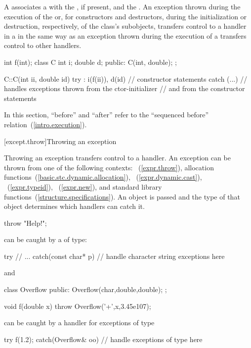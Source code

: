 \pnum
{}%
%
A
associates a
with the
,
if present, and the
.
An exception
thrown during the execution of the
or, for constructors and destructors, during the initialization or
destruction, respectively, of the class's subobjects,
transfers control to a handler in a
in the same way as an exception thrown during the execution of a
transfers control to other handlers.
\enterexample
\begin{codeblock}
int f(int);
class C {
  int i;
  double d;
public:
  C(int, double);
};

C::C(int ii, double id)
try : i(f(ii)), d(id) {
    // constructor statements
}
catch (...) {
    // handles exceptions thrown from the ctor-initializer
    // and from the constructor statements
}

\end{codeblock}
\exitexample

\pnum
In this section, ``before'' and ``after'' refer to the
``sequenced before'' relation~(\ref{intro.execution}).

[except.throw]{Throwing an exception}%
%

\pnum
Throwing an exception transfers control to a handler.
\enternote
An exception can be thrown from one of the following contexts:
~(\ref{expr.throw}),
allocation functions~(\ref{basic.stc.dynamic.allocation}),
~(\ref{expr.dynamic.cast}),
~(\ref{expr.typeid}),
~(\ref{expr.new}), and standard library
functions~(\ref{structure.specifications}).
\exitnote
An object is passed and the type of that object determines which handlers
can catch it.
\enterexample
\begin{codeblock}
throw "Help!";
\end{codeblock}
can be caught by a
of
type:
\begin{codeblock}
try {
    // ...
}
catch(const char* p) {
    // handle character string exceptions here
}
\end{codeblock}
and
\begin{codeblock}
class Overflow {
public:
    Overflow(char,double,double);
};

void f(double x) {
    throw Overflow('+',x,3.45e107);
}
\end{codeblock}
can be caught by a handler for exceptions of type
\begin{codeblock}
try {
    f(1.2);
} catch(Overflow& oo) {
    // handle exceptions of type  here
}
\end{codeblock}
\exitexample

